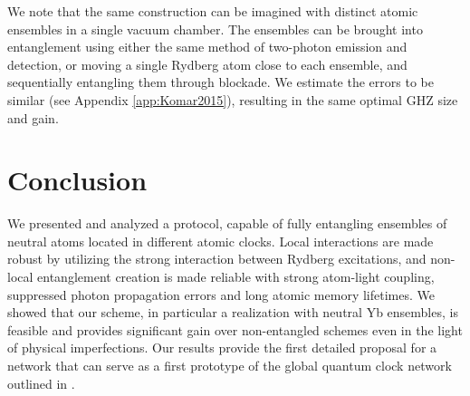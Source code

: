 We note that the same construction can be imagined
with distinct atomic ensembles in a single vacuum chamber. The ensembles can be
brought into entanglement using either the same method of two-photon emission
and detection, or moving a single Rydberg atom close to each ensemble, and
sequentially entangling them through blockade. We estimate the errors to be
similar (see Appendix \ref{app:Komar2015}), resulting in the same optimal GHZ size
and gain.




\section{Conclusion}

We presented and analyzed a protocol, capable of fully entangling ensembles of
neutral atoms located in different atomic clocks. Local interactions are made
robust by utilizing the strong interaction between Rydberg excitations, and
non-local entanglement creation is made reliable with strong atom-light
coupling, suppressed photon propagation errors and long atomic memory lifetimes.
We showed that our scheme, in particular a realization with neutral Yb
ensembles, is feasible and provides significant gain over non-entangled schemes
even in the light of physical imperfections. Our results provide the first
detailed proposal for a network that can serve as a first prototype of the
global quantum clock network outlined in \cite{Komar2014}.
